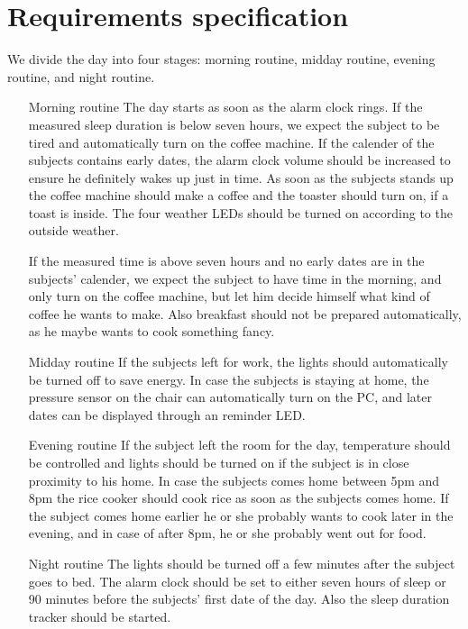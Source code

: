 \documentclass[runningheads]{llncs}
\begin{document}
\section{Requirements specification}
We divide the day into four stages: morning routine, midday routine, evening routine, and night routine.

\begin{itemize}
	\item[Morning routine] The day starts as soon as the alarm clock rings.
	If the measured sleep duration is below seven hours, we expect the subject to be tired and automatically turn on the coffee machine.
	If the calender of the subjects contains early dates, the alarm clock volume should be increased to ensure he definitely wakes up just in time.
	As soon as the subjects stands up the coffee machine should make a coffee and the toaster should turn on, if a toast is inside.  
	The four weather LEDs should be turned on according to the outside weather. 
	
	If the measured time is above seven hours and no early dates are in the subjects' calender, we expect the subject to have time in the morning, and only turn on the coffee machine, but let him decide himself what kind of coffee he wants to make.
	Also breakfast should not be prepared automatically, as he maybe wants to cook something fancy.
	
	\item[Midday routine] If the subjects left for work, the lights should automatically be turned off to save energy. 
	In case the subjects is staying at home, the pressure sensor on the chair can automatically turn on the PC, and later dates can be displayed through an reminder LED.
	
	\item[Evening routine] If the subject left the room for the day, temperature should be controlled and lights should be turned on if the subject is in close proximity to his home. 
	In case the subjects comes home between 5pm and 8pm the rice cooker should cook rice as soon as the subjects comes home. 
	If the subject comes home earlier he or she probably wants to cook later in the evening, and in case of after 8pm, he or she probably went out for food.
	
	\item[Night routine] The lights should be turned off a few minutes after the subject goes to bed. 
	The alarm clock should be set to either seven hours of sleep or 90 minutes before the subjects' first date of the day.
	Also the sleep duration tracker should be started. 
	
\end{itemize}

%
%
%
%

\end{document}
